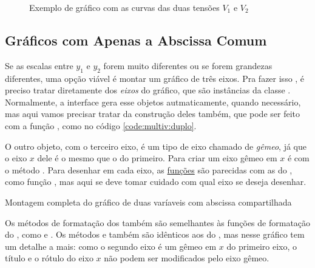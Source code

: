     \begin{figure}[htbp]
        \centering
        

        \caption{Exemplo de gráfico com as curvas das duas tensões $V_1$ e $V_2$}
        \label{fig:multiv:juntos}
    \end{figure}


\subsection{Gráficos com Apenas a Abscissa Comum}

    Se as escalas entre $y_1$ e $y_2$ forem muito diferentes ou se forem grandezas diferentes, uma opção viável é montar um gráfico de três eixos. Pra fazer isso \matplotlib, é preciso tratar diretamente dos \emph{eixos} do gráfico, que são instâncias da classe . Normalmente, a interface \pyplot gera esse objetos autmaticamente, quando necessário, mas aqui vamos precisar tratar da construção deles também, que pode ser feito com a função , como no código \ref{code:multiv:duplo}.

    O outro objeto, com o terceiro eixo, é um tipo de eixo chamado de \emph{gêmeo}, já que o eixo $x$ dele é o mesmo que o do primeiro. Para criar um eixo gêmeo em $x$ é com o método . Para desenhar em cada eixo, as \href{https://matplotlib.org/3.1.0/api/axes_api.html\#plotting}{funções} são parecidas com as do \pyplot, como função , mas aqui se deve tomar cuidado com qual eixo se deseja desenhar.

    \begin{listing}[H]
        \caption{Montagem completa do gráfico de duas varíaveis com abscissa compartilhada}
        \label{code:multiv:duplo}

    \end{listing}

    Os métodos de formatação dos  também são semelhantes às funções de formatação do \pyplot, como  e . Os métodos  e  também são idênticos aos do \pyplot, mas nesse gráfico tem um detalhe a mais: como o segundo eixo é um gêmeo em $x$ do primeiro eixo, o título e o rótulo do eixo $x$ não podem ser modificados pelo eixo gêmeo.


